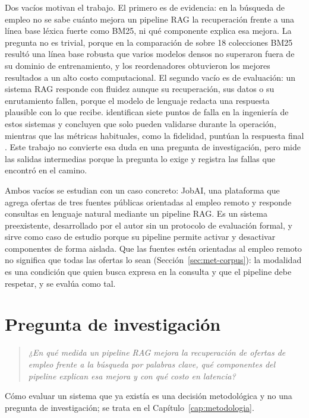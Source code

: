 Dos vacíos motivan el trabajo. El primero es de evidencia: en la búsqueda de empleo no se sabe cuánto mejora un pipeline RAG la recuperación frente a una línea base léxica fuerte como BM25, ni qué componente explica esa mejora. La pregunta no es trivial, porque en la comparación de \citet{Thakur2021} sobre 18 colecciones BM25 resultó una línea base robusta que varios modelos densos no superaron fuera de su dominio de entrenamiento, y los reordenadores obtuvieron los mejores resultados a un alto costo computacional. El segundo vacío es de evaluación: un sistema RAG responde con fluidez aunque su recuperación, sus datos o su enrutamiento fallen, porque el modelo de lenguaje redacta una respuesta plausible con lo que recibe. \citet{Barnett2024} identifican siete puntos de falla en la ingeniería de estos sistemas y concluyen que solo pueden validarse durante la operación, mientras que las métricas habituales, como la fidelidad, puntúan la respuesta final \citep{Es2024}. Este trabajo no convierte esa duda en una pregunta de investigación, pero mide las salidas intermedias porque la pregunta lo exige y registra las fallas que encontró en el camino.

Ambos vacíos se estudian con un caso concreto: JobAI, una plataforma que agrega ofertas de tres fuentes públicas orientadas al empleo remoto y responde consultas en lenguaje natural mediante un pipeline RAG. Es un sistema preexistente, desarrollado por el autor sin un protocolo de evaluación formal, y sirve como caso de estudio porque su pipeline permite activar y desactivar componentes de forma aislada. Que las fuentes estén orientadas al empleo remoto no significa que todas las ofertas lo sean (Sección~\ref{sec:met-corpus}): la modalidad es una condición que quien busca expresa en la consulta y que el pipeline debe respetar, y se evalúa como tal.

\section{Pregunta de investigación}

\begin{quote}
\textit{¿En qué medida un pipeline RAG mejora la recuperación de ofertas de empleo frente a la búsqueda por palabras clave, qué componentes del pipeline explican esa mejora y con qué costo en latencia?}
\end{quote}

Cómo evaluar un sistema que ya existía es una decisión metodológica y no una pregunta de investigación; se trata en el Capítulo~\ref{cap:metodologia}.

